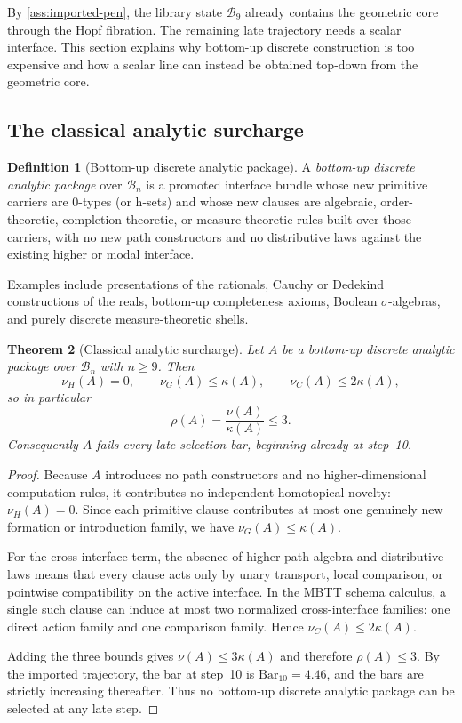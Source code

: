 \documentclass[11pt]{article}
\theoremstyle{plain}
\newtheorem{theorem}{Theorem}[section]
\theoremstyle{definition}
\newtheorem{definition}[theorem]{Definition}
\theoremstyle{remark}
\newcommand{\B}{\mathcal{B}}
\newcommand{\SelBar}{\mathrm{Bar}}
\begin{document}
By \cref{ass:imported-pen}, the library state $\B_9$ already contains the geometric core through the Hopf fibration. The remaining late trajectory needs a scalar interface. This section explains why bottom-up discrete construction is too expensive and how a scalar line can instead be obtained top-down from the geometric core.

\subsection{The classical analytic surcharge}

\begin{definition}[Bottom-up discrete analytic package]
\label{def:discrete-analytic}
A \emph{bottom-up discrete analytic package} over $\B_n$ is a promoted interface bundle whose new primitive carriers are $0$-types (or h-sets) and whose new clauses are algebraic, order-theoretic, completion-theoretic, or measure-theoretic rules built over those carriers, with no new path constructors and no distributive laws against the existing higher or modal interface.
\end{definition}

Examples include presentations of the rationals, Cauchy or Dedekind constructions of the reals, bottom-up completeness axioms, Boolean $\sigma$-algebras, and purely discrete measure-theoretic shells.

\begin{theorem}[Classical analytic surcharge]
\label{thm:analytic-surcharge}
Let $A$ be a bottom-up discrete analytic package over $\B_n$ with $n\ge 9$. Then
\[
  \nu_H(A)=0,
  \qquad
  \nu_G(A)\le \kappa(A),
  \qquad
  \nu_C(A)\le 2\kappa(A),
\]
so in particular
\[
  \rho(A)=\frac{\nu(A)}{\kappa(A)}\le 3.
\]
Consequently $A$ fails every late selection bar, beginning already at step~10.
\end{theorem}

\begin{proof}
Because $A$ introduces no path constructors and no higher-dimensional computation rules, it contributes no independent homotopical novelty: $\nu_H(A)=0$. Since each primitive clause contributes at most one genuinely new formation or introduction family, we have $\nu_G(A)\le \kappa(A)$.

For the cross-interface term, the absence of higher path algebra and distributive laws means that every clause acts only by unary transport, local comparison, or pointwise compatibility on the active interface. In the MBTT schema calculus, a single such clause can induce at most two normalized cross-interface families: one direct action family and one comparison family. Hence $\nu_C(A)\le 2\kappa(A)$.

Adding the three bounds gives $\nu(A)\le 3\kappa(A)$ and therefore $\rho(A)\le 3$. By the imported trajectory, the bar at step~10 is $\SelBar_{10}=4.46$, and the bars are strictly increasing thereafter. Thus no bottom-up discrete analytic package can be selected at any late step.
\end{proof}
\end{document}
